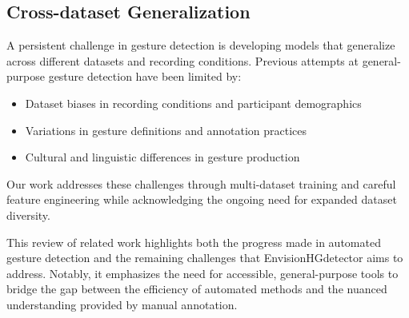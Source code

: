 \subsection{Cross-dataset Generalization}\label{subsec:generalization}
A persistent challenge in gesture detection is developing models that generalize across different datasets and recording conditions. Previous attempts at general-purpose gesture detection have been limited by:
\begin{itemize}
    \item Dataset biases in recording conditions and participant demographics
    \item Variations in gesture definitions and annotation practices
    \item Cultural and linguistic differences in gesture production
\end{itemize}

Our work addresses these challenges through multi-dataset training and careful feature engineering while acknowledging the ongoing need for expanded dataset diversity.

This review of related work highlights both the progress made in automated gesture detection and the remaining challenges that EnvisionHGdetector aims to address. Notably, it emphasizes the need for accessible, general-purpose tools to bridge the gap between the efficiency of automated methods and the nuanced understanding provided by manual annotation.
\fi